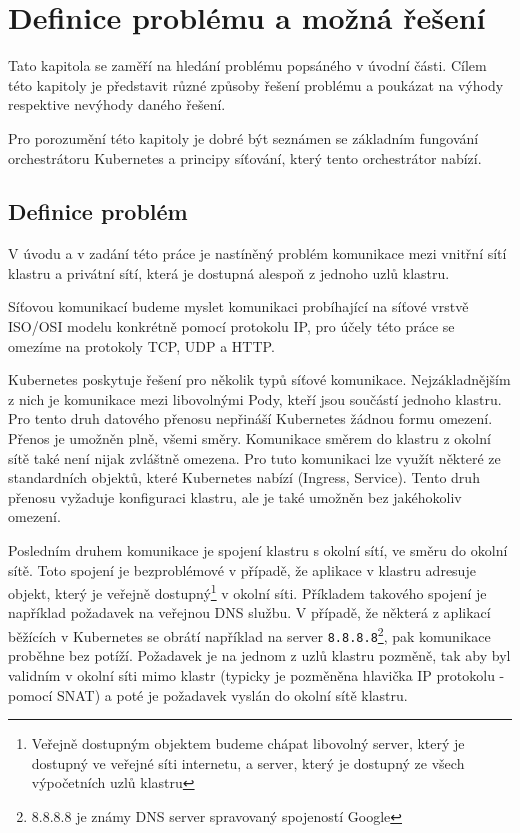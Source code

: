 \chapter{Definice problému a možná řešení}

\begin{chapterabstract}
Tato kapitola se zaměří na hledání problému popsáného v úvodní části. Cílem této kapitoly je představit různé způsoby řešení problému a poukázat na výhody respektive nevýhody daného řešení.

Pro porozumění této kapitoly je dobré být seznámen se základním fungování orchestrátoru Kubernetes a principy síťování, který tento orchestrátor nabízí.  
\end{chapterabstract}


\section{Definice problém}
V úvodu a v zadání této práce je nastíněný problém komunikace mezi vnitřní sítí klastru a privátní sítí, která je dostupná alespoň z jednoho uzlů klastru. 

Síťovou komunikací budeme myslet komunikaci probíhající na síťové vrstvě ISO/OSI modelu konkrétně pomocí protokolu IP, pro účely této práce se omezíme na protokoly TCP, UDP a HTTP.

Kubernetes poskytuje řešení pro několik typů síťové komunikace. Nejzákladnějším z nich je komunikace mezi libovolnými Pody, kteří jsou součástí jednoho klastru. Pro tento druh datového přenosu nepřináší Kubernetes žádnou formu omezení. Přenos je umožněn plně, všemi směry. Komunikace směrem do klastru z okolní sítě také není nijak zvláštně omezena. Pro tuto komunikaci lze využít některé ze standardních objektů, které Kubernetes nabízí (Ingress, Service). Tento druh přenosu vyžaduje konfiguraci klastru, ale je také umožněn bez jakéhokoliv omezení.

Posledním druhem komunikace je spojení klastru s okolní sítí, ve směru do okolní sítě. Toto spojení je bezproblémové v případě, že aplikace v klastru adresuje objekt, který je veřejně dostupný\footnote{Veřejně dostupným objektem budeme chápat libovolný server, který je dostupný ve veřejné síti internetu, a server, který je dostupný ze všech výpočetních uzlů klastru} v okolní síti. Příkladem takového spojení je například požadavek na veřejnou DNS službu. V případě, že některá z aplikací běžících v Kubernetes se obrátí například na server \verb|8.8.8.8|\footnote{8.8.8.8 je známy DNS server spravovaný spojeností Google}, pak komunikace proběhne bez potíží. Požadavek je na jednom z uzlů klastru pozměně, tak aby byl validním v okolní síti mimo klastr (typicky je pozměněna hlavička IP protokolu - pomocí SNAT) a poté je požadavek vyslán do okolní sítě klastru.

